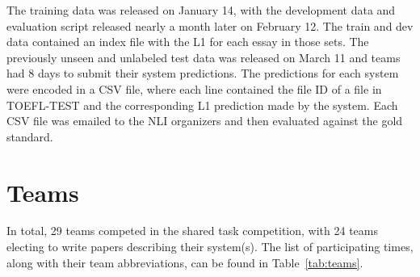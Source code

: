 \documentclass[11pt,letterpaper]{article}
\begin{document}
The training data was released on January 14, with the development
data and evaluation script released nearly a month later on February 12.
The train and dev data contained an index file with the L1 for each
essay in those sets.  The previously unseen and unlabeled test data was
released on March 11 and teams had 8 days to submit their system predictions.
The predictions for each system
were encoded in a CSV file, where each line contained the file ID of a
file in TOEFL-TEST and the corresponding L1 prediction made by the
system.  Each CSV file was emailed to the NLI organizers and then
evaluated against the gold standard.


\section{Teams}
\label{sec-teams}
In total, 29 teams competed in the shared task competition, with 24 teams
electing to write papers describing their system(s).  The list
of participating times, along with their team abbreviations, can be
found in Table~\ref{tab:teams}.
\end{document}
